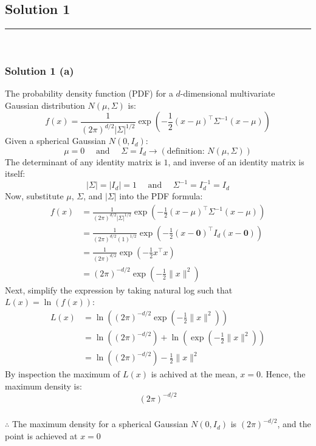 \documentclass{article}
\begin{document}
\pagestyle{fancy}

\subsection*{Solution 1}
\noindent\rule{\textwidth}{0.4pt}\\
\subsubsection*{Solution 1 (a)}
The probability density function (PDF) for a $d$-dimensional multivariate Gaussian distribution $N(\mu, \Sigma)$ is:
$$ f(x) = \frac{1}{(2\pi)^{d/2} |\Sigma|^{1/2}} \exp\left( -\frac{1}{2} (x - \mu)^\top \Sigma^{-1} (x - \mu) \right) $$
Given a spherical Gaussian $N(0, I_d)$:
$$\mu = 0 \quad \text{ and }\quad \Sigma = I_d \rightarrow (\text{definition: }N(\mu, \Sigma))$$
The determinant of any identity matrix is $1$, and inverse of an identity matrix is itself:
$$|\Sigma| = |I_d| = 1 \quad \text{ and }\quad \Sigma^{-1} = I_d^{-1} = I_d$$
Now, substitute $\mu$, $\Sigma$, and $|\Sigma|$ into the PDF formula:
\begin{align*}
    f(x) &= \frac{1}{(2\pi)^{d/2} |\Sigma|^{1/2}} \exp\left( -\frac{1}{2} (x - \mu)^\top \Sigma^{-1} (x - \mu) \right) \\
    &= \frac{1}{(2\pi)^{d/2} (1)^{1/2}} \exp\left( -\frac{1}{2} (x - \mathbf{0})^\top I_d (x - \mathbf{0}) \right) \\
    &= \frac{1}{(2\pi)^{d/2}} \exp\left( -\frac{1}{2} x^\top x \right) \\
    &= (2\pi)^{-d/2} \exp\left( -\frac{1}{2} \|x\|^2 \right)
\end{align*}
Next, simplify the expression by taking natural log such that $L(x)=\ln(f(x))$:
\begin{align*}
    L(x) &= \ln\left((2\pi)^{-d/2} \exp\left( -\frac{1}{2} \|x\|^2 \right)\right) \\
    &= \ln\left((2\pi)^{-d/2}\right) + \ln\left(\exp\left( -\frac{1}{2} \|x\|^2 \right)\right) \\
    &= \ln\left((2\pi)^{-d/2}\right) - \frac{1}{2} \|x\|^2  
\end{align*}
By inspection the maximum of $L(x)$ is achived at the mean, $x = 0$.
Hence, the maximum density is:
$$(2\pi)^{-d/2}$$

\subsubsection*{\normalfont}{$\therefore$ The maximum density for a spherical Gaussian $N(0, I_d)$ is $(2\pi)^{-d/2}$, and the point is achieved at $x = 0$}
\end{document}
